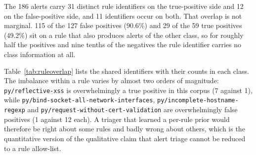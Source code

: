 \documentclass[journal]{IEEEtran}
\theoremstyle{definition}
\newcommand{\RNtp}{59}
\newcommand{\RNfp}{127}
\newcommand{\CNtpRules}{31}
\newcommand{\CNfpRules}{12}
\newcommand{\CNshared}{11}
\newcommand{\CTpOnShared}{29}
\newcommand{\CFpOnShared}{115}
\newcommand{\CTpOnSharedPct}{49.2}
\newcommand{\CFpOnSharedPct}{90.6}
\newcommand{\CNall}{186}
\begin{document}
The \CNall{} alerts carry \CNtpRules{} distinct rule identifiers on the
true-positive side and \CNfpRules{} on the false-positive side, and
\CNshared{} identifiers occur on both. That overlap is not marginal.
\CFpOnShared{} of the \RNfp{} false positives (\CFpOnSharedPct\%) and
\CTpOnShared{} of the \RNtp{} true positives (\CTpOnSharedPct\%) sit on a rule
that also produces alerts of the other class, so for roughly half the positives
and nine tenths of the negatives the rule identifier carries no class
information at all.

Table~\ref{tab:ruleoverlap} lists the shared identifiers with their counts in
each class. The imbalance within a rule varies by almost two orders of
magnitude: \texttt{py/\allowbreak{}reflective-\allowbreak{}xss} is overwhelmingly a true positive in this
corpus (7 against 1), while \texttt{py/\allowbreak{}bind-\allowbreak{}socket-\allowbreak{}all-\allowbreak{}network-\allowbreak{}interfaces},
\texttt{py/\allowbreak{}incomplete-\allowbreak{}hostname-\allowbreak{}regexp} and
\texttt{py/\allowbreak{}request-\allowbreak{}without-\allowbreak{}cert-\allowbreak{}validation} are overwhelmingly false positives
(1 against 12 each). A triager that learned a per-rule prior would therefore be
right about some rules and badly wrong about others, which is the quantitative
version of the qualitative claim that alert triage cannot be reduced to a rule
allow-list.
\end{document}
